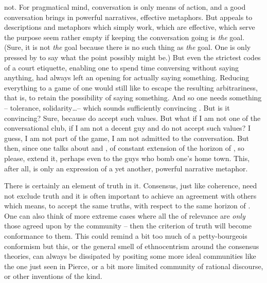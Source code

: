 not.  For pragmatical mind, conversation is only means of action, and a good
conversation brings in powerful narratives, effective metaphors.  But appeals to
descriptions and metaphors which simply work, which are effective, which serve
the purpose seem rather empty if keeping the conversation going is {\em the}
goal.  (Sure, it is not {\em the} goal because there is no such thing as {\em
  the} goal.  One is only pressed by  to say what the
point possibly might be.)  But even the strictest codes of a court etiquette,
enabling one to spend time conversing without saying anything, had always left
an opening for actually saying something.  Reducing everything to a game of
 one would still like to escape the resulting arbitrariness, that
is, to retain the possibility of saying something.  And so one needs something
-- tolerance, solidarity\ldots -- which sounds sufficiently convincing
.  But is it convincing?  Sure, because  do accept such values.  But what if I am not one of the conversational
club, if I am not a decent guy and do not accept such values?  I guess, I am not
part of the game, I am not admitted to the conversation.  But then, since one
talks about  and , of constant extension of the
horizon of , so please, extend it, perhaps even to the guys who bomb
one's home town.  This, after all, is only an expression of a yet another,
powerful narrative metaphor.

\pa There is certainly an element of truth in it. Consensus, just like
coherence, need not exclude truth and it is often important to achieve an
agreement with others which means, to accept the same truths, with respect to
the same horizon of .  One can also think of more extreme cases
where all the  of relevance are {\em only} those agreed upon by
the community -- then the criterion of truth will become conformance to them.
This could remind a bit too much of a petty-bourgeois conformism but this, or
the general smell of ethnocentrism around the consensus theories, can always be
dissipated by positing some more ideal communities like the one just seen in
Pierce, or a bit more limited community of rational discourse, or other
inventions of the kind. 

